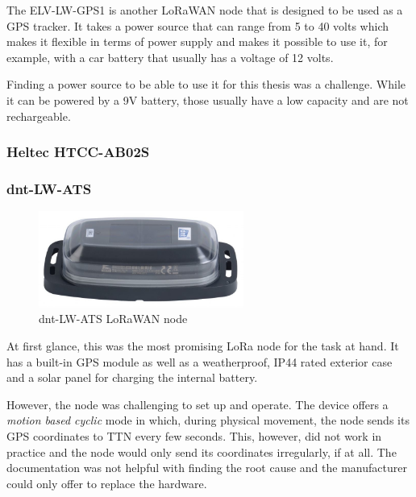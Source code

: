 The ELV-LW-GPS1 is another \ac{LoRaWAN} node that is designed to be used as a \ac{GPS} tracker.
It takes a power source that can range from 5 to 40 volts which makes it flexible in terms of power supply and makes it possible to use it, for example, with a car battery that usually has a voltage of 12 volts.

Finding a power source to be able to use it for this thesis was a challenge.
While it can be powered by a 9V battery, those usually have a low capacity and are not rechargeable.


\subsubsection{Heltec HTCC-AB02S}



\subsubsection{dnt-LW-ATS}

\begin{figure}
    \centering
    \includegraphics[width=0.6\textwidth]{pictures/hardware/gps-nodes/dnt-LW-ATS.jpg}
    \caption{dnt-LW-ATS \ac{LoRaWAN} node~\protect\cite{dnt_gmbh_dnt_nodate}}
\end{figure}

At first glance, this was the most promising \ac{LoRa} node for the task at hand.
It has a built-in \ac{GPS} module as well as a weatherproof, IP44 rated exterior case and a solar panel for charging the internal battery.

However, the node was challenging to set up and operate.
The device offers a \emph{motion based cyclic} mode in which, during physical movement, the node sends its \ac{GPS} coordinates to \ac{TTN} every few seconds.
This, however, did not work in practice and the node would only send its coordinates irregularly, if at all.
The documentation was not helpful with finding the root cause and the manufacturer could only offer to replace the hardware.

